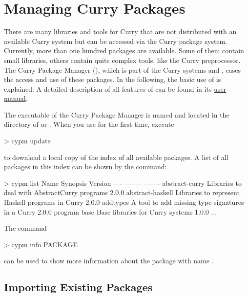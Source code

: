 \chapter{Managing Curry Packages}

There are many libraries and tools for Curry
that are not distributed with an available Curry system
but can be accessed via the Curry package system.
Currently, more than one hundred packages are
available.
Some of them contain small libraries, others
contain quite complex tools, like the Curry preprocessor.
The Curry Package Manager (\cpm),
which is part of the Curry systems \pakcs and \kics,
eases the access and use of these packages.
In the following, the basic use of \cpm is explained.
A detailed description of all features of \cpm
can be found in its
\href{http://curry-language.org/tools/cpm}{user manual}.

The executable of the Curry Package Manager is named 
and located in the  directory of \pakcs or \kics.
When you use \cpm for the first time, execute
%
\begin{prog}
> cypm update
\end{prog}
%
to download a local copy of the index of all available packages.
A list of all packages in this index can be shown by
the  command:
%
\begin{prog}
> cypm list
Name               Synopsis                                           Version   
----               --------                                           -------   
abstract-curry     Libraries to deal with AbstractCurry programs      2.0.0     
abstract-haskell   Libraries to represent Haskell programs in Curry   2.0.0     
addtypes           A tool to add missing type signatures in a Curry   2.0.0     
                   program                                           
base               Base libraries for Curry systems                   1.0.0     
$\ldots$
\end{prog}
%
The command
%
\begin{prog}
> cypm info PACKAGE
\end{prog}
%
can be used to show more information about the package with name
.

\section{Importing Existing Packages}
\label{sec:importing-packages}

